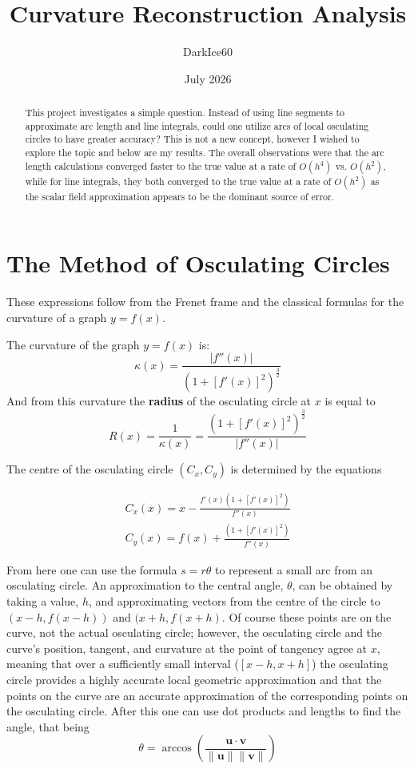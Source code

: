 \documentclass{article}
\title{Curvature Reconstruction Analysis}
\author{DarkIce60}
\date{July 2026}
\begin{document}
\maketitle

\begin{abstract}
This project investigates a simple question. Instead of using line segments to approximate arc length and line integrals, could one utilize arcs of local osculating circles to have greater accuracy? This is not a new concept, however I wished to explore the topic and below are my results. The overall observations were that the arc length calculations converged faster to the true value at a rate of $O(h^4)$ vs. $O(h^2)$, while for line integrals, they both converged to the true value at a rate of $O(h^2)$ as the scalar field approximation appears to be the dominant source of error.
\end{abstract}

\section{The Method of Osculating Circles}
These expressions follow from the Frenet frame and the classical formulas for the curvature of a graph $y= f(x)$.

The curvature of the graph $y=f(x)$ is:
\[
\kappa(x) = \frac{|f''(x)|}{(1+[f'(x)]^2)^\frac{3}{2}}
\]
And from this curvature the \textbf{radius} of the osculating circle at $x$ is equal to
\[
R(x)= \frac{1}{\kappa(x)} =  \frac{(1+[f'(x)]^2)^\frac{3}{2}}{|f''(x)|}
\]

The centre of the osculating circle $(C_x, C_y)$ is determined by the equations

\begin{gather*}
C_x(x) = x - \frac{f'(x)(1+[f'(x)]^2)}{f''(x)} \\
C_y(x) = f(x) + \frac{(1+[f'(x)]^2)}{f''(x)}
\end{gather*}

From here one can use the formula $s = r\theta$ to represent a small arc from an osculating circle. An approximation to the central angle, $\theta$, can be obtained by taking a value, $h$, and approximating vectors from the centre of the circle to $(x-h,f(x-h))$ and $(x+h, f(x+h)$. Of course these points are on the curve, not the actual osculating circle; however, the osculating circle and the curve's position, tangent, and curvature at the point of tangency agree at $x$, meaning that over a sufficiently small interval ($[x-h, x+h]$) the osculating circle provides a highly accurate local geometric approximation and that the points on the curve are an accurate approximation of the corresponding points on the osculating circle. After this one can use dot products and lengths to find the angle, that being
\[
\theta = \arccos(\frac{\mathbf{u} \cdot \mathbf{v}}{\|\mathbf{u}\|\|\mathbf{v}\|})
\]
\end{document}
